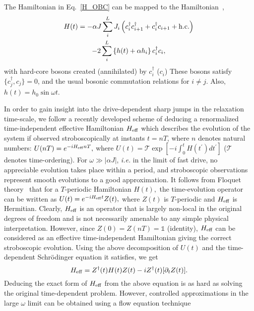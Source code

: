 \documentclass[reprint,preprintnumbers,showpacs,amsmath,twocolumn,showkeys,aps,prl]{revtex4-1}
\begin{document}
\noindent
The Hamiltonian in Eq.~\ref{H_OBC}
can be mapped to the Hamiltonian~\cite{Lieb,Young-Random,Dziarmaga-Random},
\begin{multline}
H(t) = - \alpha J \sum_{i}^{L}  J_i \left(c^{\dagger}_i c^{\dagger}_{i+1} 
+ c^{\dagger}_i c_{i+1}  + {\rm h.c.}\right) \\
- 2 \sum_i^{L} \left\{h(t)+\alpha h_i\right\} c^{\dagger}_i c_i,
\label{H_Fermi}
\end{multline}
\noindent
with hard-core bosons  created (annihilated) by $c^\dagger_i$ ($c^{\;}_i$)
These bosons satisfy $\{ c_{j}^{\dagger},c_{j} \}=0$, and the usual bosonic commutation relations for $i\ne j$. Also, $h(t)=h_0\sin{\omega t}$.

In order to gain insight into the drive-dependent sharp jumps in the relaxation time-scale,
we follow a recently developed scheme \cite{Mintert} of deducing a renormalized time-independent effective 
Hamiltonian $H_{\rm eff}$ which describes the evolution of the system if observed stroboscopically at instants
$t = nT$, where $n$ denotes natural numbers: $U(nT) = e^{-iH_{\rm eff}nT},$ 
where $U(t) = {\mathcal T}\exp{[-i\int_{0}^{t}H(t^{\prime})dt^{\prime}]}$ (${\mathcal T}$ denotes time-ordering).  
For $\omega \gg |\alpha J|$, \textit{i.e.} in the limit of fast drive, no appreciable evolution takes place within a 
period, and stroboscopic observations represent smooth evolutions to a good approximation.  
It follows from Floquet theory~\cite{Floquet-Original} that for a $T$-periodic Hamiltonian $H(t),$ 
the time-evolution operator can be written as $U(t) = e^{-iH_{\rm eff}t}Z(t),$ where $Z(t)$ is $T$-periodic 
and $H_{\rm eff}$ is Hermitian. Clearly, $H_{\rm eff}$ is an operator that is largely non-local in the original 
degrees of freedom and is not necessarily amenable to any simple physical interpretation. 
However, since $Z(0)=Z(nT)=\mathds{1}$ (identity), $H_{\rm eff}$ can be considered as
an effective time-independent Hamiltonian giving the correct stroboscopic evolution. 
Using the above decomposition of $U(t)$ and the time-dependent Schr\"{o}dinger equation it satisfies, we get
\begin{equation} 
H_{\rm eff} = Z^{\dagger}(t)H(t)Z(t) -iZ^{\dagger}(t)[\partial_{t}Z(t)].
\label{Heff} 
\end{equation}
\noindent
Deducing the exact form of $H_{\rm eff}$ from the above equation is as hard as solving the original 
time-dependent problem. However, controlled approximations in the large $\omega$ limit can
be obtained \cite{Mintert} using a flow equation technique \cite{Wegner,Kehrein-book} 
\end{document}
